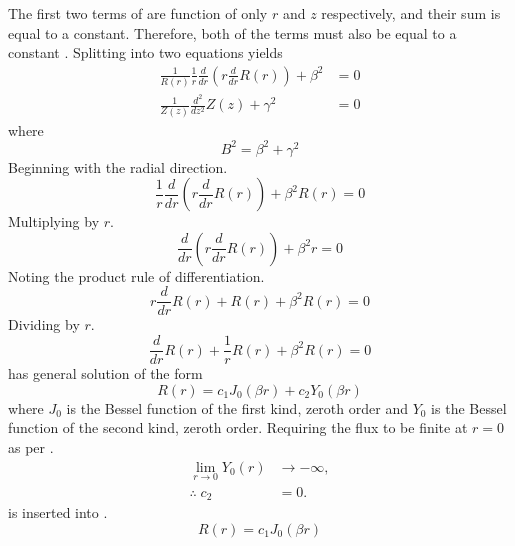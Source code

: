   The first two terms of  are function of only $r$ and
  $z$ respectively, and their sum is equal to a constant. Therefore, both of the
  terms must also be equal to a constant \cite{lamarsh1966}. Splitting
   into two equations yields
  \begin{align}
    \frac{1}{R(r)} \frac{1}{r} \frac{d}{dr} \left( r \frac{d}{dr} R(r) \right) +
      \beta^2 &= 0 \\
    \label{eq:finite_cyl_zeq}
    \frac{1}{Z(z)} \frac{d^2}{dz^2} Z(z) + \gamma^2 &= 0
  \end{align}
  where
  \begin{equation}
    \label{eq:finite_cyl_b2_sum}
    B^2 = \beta^2 + \gamma^2
  \end{equation}
  Beginning with the radial direction.
  \begin{equation}
    \frac{1}{r} \frac{d}{dr} \left( r \frac{d}{dr} R(r) \right) + \beta^2 R(r) =
    0
  \end{equation}
  Multiplying by $r$.
  \begin{equation}
    \frac{d}{dr} \left( r \frac{d}{dr} R(r) \right) + \beta^2 r = 0
  \end{equation}
  Noting the product rule of differentiation.
  \begin{equation}
    r \frac{d}{dr} R(r) + R(r) + \beta^2 R(r) = 0
  \end{equation}
  Dividing by $r$.
  \begin{equation}
    \label{eq:finite_cyl_bessel}
    \frac{d}{dr} R(r) + \frac{1}{r} R(r) + \beta^2 R(r) = 0
  \end{equation}
   has general solution of the form
  \begin{equation}
    \label{eq:finite_cyl_bessel_general}
    R(r) = c_1 J_0(\beta r ) + c_2 Y_0(\beta r)
  \end{equation}
  where $J_0$ is the Bessel function of the first kind, zeroth order and $Y_0$
  is the Bessel function of the second kind, zeroth order. Requiring the flux to
  be finite at $r=0$ as per .
  \begin{align}
    \lim_{r \rightarrow 0} Y_0(r) &\rightarrow - \infty, \\
    \label{eq:finite_cyl_c2}
    \therefore \; c_2 &= 0.
  \end{align}
   is inserted into .
  \begin{equation}
    \label{eq:finite_cyl_j0}
    R(r) = c_1 J_0(\beta r)
  \end{equation}
